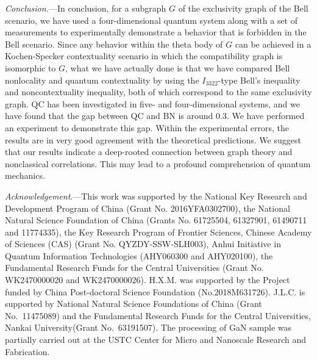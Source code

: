 \documentclass[prl,letterpaper,english,reprint,nofootinbib,aps,superscriptaddress,showpacs,showkeys]{revtex4-1}
\theoremstyle{definition}
\theoremstyle{remark}
\begin{document}
 \emph{Conclusion.}---In conclusion, for a subgraph $G$ of the exclusivity graph of the Bell scenario, we have used a four-dimensional quantum system along with a set of measurements to experimentally demonstrate a behavior that is forbidden in the Bell scenario. Since any behavior within the theta body of $G$ can be achieved in a Kochen-Specker contextuality scenario in which the compatibility graph is isomorphic to $G$, what we have actually done is that we have compared Bell nonlocality and quantum contextuality by using the $I_{3322}$-type Bell's inequality and noncontextuality inequality, both of which correspond to the same exclusivity graph. QC has been investigated in  five- and four-dimensional systems, and we have found that the gap between QC and BN is around $0.3$. We have performed an experiment to demonstrate this gap. Within the experimental errors, the results are in very good agreement with the theoretical predictions.
We suggest that our results indicate a deep-rooted connection between graph theory and nonclassical correlations. This may lead to a profound comprehension of quantum mechanics.




 \textit{Acknowledgement}.---This work was supported by the National Key Research and Development Program of China (Grant No. 2016YFA0302700), the National Natural Science Foundation of China (Grants No. 61725504, 61327901, 61490711 and 11774335), the Key Research Program of Frontier Sciences, Chinese Academy of Sciences (CAS) (Grant No. QYZDY-SSW-SLH003), Anhui Initiative in Quantum Information Technologies (AHY060300 and AHY020100), the Fundamental Research Funds for the Central Universities (Grant No. WK2470000020 and WK2470000026). H.X.M. was supported by the Project funded by China Post-doctoral Science Foundation
 (No.2018M631726). J.L.C. is supported by National Natural Science Foundations of China (Grant No.\ 11475089) and the Fundamental Research Funds for the Central Universities, Nankai University(Grant No.\ 63191507). The processing of GaN sample was partially carried out at the USTC Center for Micro and Nanoscale Research and Fabrication.
\end{document}
